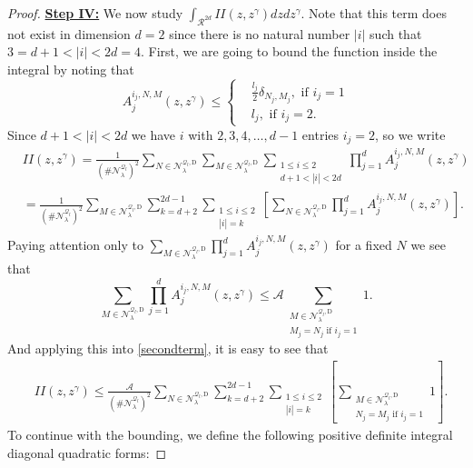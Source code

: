\documentclass{amsart}
\theoremstyle{definition}
\theoremstyle{remark}
\renewcommand\leq\leqslant
\numberwithin{equation}{section}
\theoremstyle{definition}
\theoremstyle{remark}
\begin{document}
\begin{proof}
\textbf{	\underline{Step IV:}}	We now study $\int_{\mathcal{R}^{2d}}II(z,z^\gamma)dzdz^\gamma$. Note that this term does not exist in dimension $d=2$ since there is no natural number $|i|$ such that $3=d+1<|i|<2d=4$. First, we are going to bound the function inside the integral by noting that 
	\begin{equation}
		A_j^{i_j,N,M}(z,z^\gamma)\leq\left\{\begin{aligned}
			&\frac{l_j}{2}\delta_{N_j,M_j},\text{ if }i_j=1\\
			&l_j,\text{ if }i_j=2.
		\end{aligned}
		\right.
	\end{equation}
	Since $d+1<|i|<2d$ we have $i$ with $2,3,4,\ldots,d-1$ entries $i_j=2$, so we write
	\begin{equation}\label{secondterm}
		\begin{aligned}
			&II(z,z^\gamma)=\frac{1}{\left(\#\mathcal{N}_\lambda^{\mathcal{Q}_l}\right)^2}\sum_{N\in\mathcal{N}_\lambda^{\mathcal{Q}_l,\mathrm{D}}}\sum_{M\in\mathcal{N}_\lambda^{\mathcal{Q}_l,\mathrm{D}}}\sum_{\substack{1\leq i\leq 2\\d+1<|i|<2d}} \prod_{j=1}^d A_j^{i_j,N,M}(z,z^\gamma)\\
			&=\frac{1}{\left(\#\mathcal{N}_\lambda^{\mathcal{Q}_l}\right)^2}\sum_{M\in\mathcal{N}_\lambda^{\mathcal{Q}_l,\mathrm{D}}}\sum_{k=d+2}^{2d-1}\sum_{\substack{1\leq i\leq 2\\|i|=k}}\left[ \sum_{N\in\mathcal{N}_\lambda^{\mathcal{Q}_l,\mathrm{D}}}\prod_{j=1}^d A_j^{i_j,N,M}(z,z^\gamma)\right].	\end{aligned}
	\end{equation}
	Paying attention only to $\sum_{M\in\mathcal{N}_\lambda^{\mathcal{Q}_l,\mathrm{D}}}\prod_{j=1}^d A_j^{i_j,N,M}(z,z^\gamma)$ for a fixed $N$ we see that
	\begin{equation}
		\sum_{M\in\mathcal{N}_\lambda^{\mathcal{Q}_l,\mathrm{D}}}\prod_{j=1}^d A_j^{i_j,N,M}(z,z^\gamma)\leq\mathcal{A}\sum_{\substack{M\in\mathcal{N}_\lambda^{\mathcal{Q}_l,\mathrm{D}}\\M_j=N_j\text{ if }i_j=1}}1.
	\end{equation}And applying this into \eqref{secondterm}, it is easy to see that
	\begin{equation}
		\begin{aligned}
			&II(z,z^\gamma)\leq\frac{\mathcal{A}}{\left(\#\mathcal{N}_\lambda^{\mathcal{Q}_l}\right)^2}\sum_{N\in\mathcal{N}_\lambda^{\mathcal{Q}_l,\mathrm{D}}}\sum_{k=d+2}^{2d-1}\sum_{\substack{1\leq i\leq 2\\|i|=k}}\left[ \sum_{\substack{M\in\mathcal{N}_\lambda^{\mathcal{Q}_l,\mathrm{D}}\\N_j=M_j\text{ if }i_j=1}}1\right].
		\end{aligned}
	\end{equation}
	To continue with the bounding, we define the following positive definite integral diagonal quadratic forms: 


\end{proof}
\end{document}
